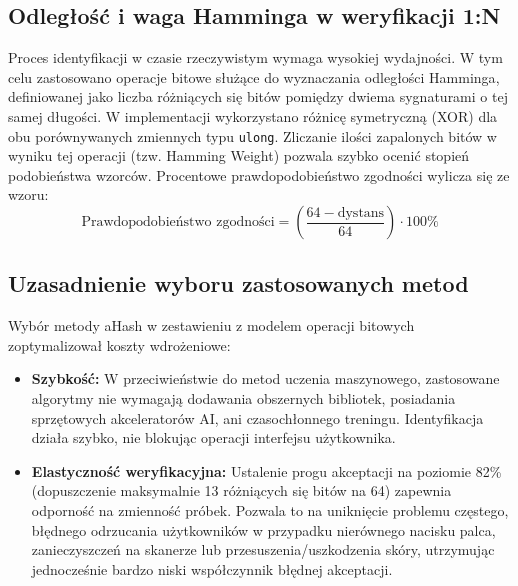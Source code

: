 \subsection{Odległość i waga Hamminga w weryfikacji 1:N}
Proces identyfikacji w czasie rzeczywistym wymaga wysokiej wydajności. W tym celu zastosowano operacje bitowe służące do wyznaczania odległości Hamminga\cite{HammingDistanceDataCamp}, definiowanej jako liczba różniących się bitów pomiędzy dwiema sygnaturami o tej samej długości. W implementacji wykorzystano różnicę symetryczną (XOR) dla obu porównywanych zmiennych typu \texttt{ulong}. Zliczanie ilości zapalonych bitów w wyniku tej operacji (tzw. Hamming Weight) pozwala szybko ocenić stopień podobieństwa wzorców.
Procentowe prawdopodobieństwo zgodności wylicza się ze wzoru:
\begin{equation}
    \text{Prawdopodobieństwo zgodności} = \left( \frac{64 - \text{dystans}}{64} \right) \cdot 100\%
\end{equation}

\subsection{Uzasadnienie wyboru zastosowanych metod}
Wybór metody aHash w zestawieniu z modelem operacji bitowych zoptymalizował koszty wdrożeniowe:
\begin{itemize}
    \item \textbf{Szybkość:} W przeciwieństwie do metod uczenia maszynowego, zastosowane algorytmy nie wymagają dodawania obszernych bibliotek, posiadania sprzętowych akceleratorów AI, ani czasochłonnego treningu. Identyfikacja działa szybko, nie blokując operacji interfejsu użytkownika.
    \item \textbf{Elastyczność weryfikacyjna:} Ustalenie progu akceptacji na poziomie 82\% (dopuszczenie maksymalnie 13 różniących się bitów na 64) zapewnia odporność na zmienność próbek. Pozwala to na uniknięcie problemu częstego, błędnego odrzucania użytkowników w przypadku nierównego nacisku palca, zanieczyszczeń na skanerze lub przesuszenia/uszkodzenia skóry, utrzymując jednocześnie bardzo niski współczynnik błędnej akceptacji.
\end{itemize}
